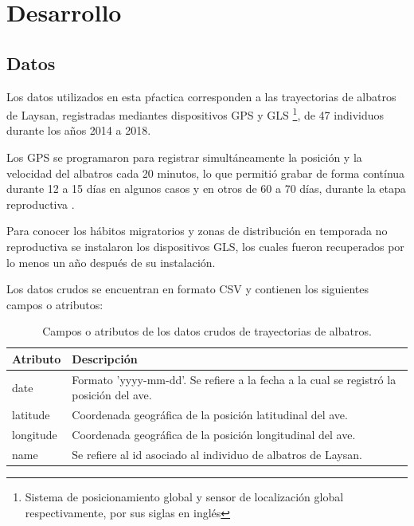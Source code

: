 
\section{Desarrollo}



\subsection{Datos}

Los datos utilizados en esta pŕactica corresponden a las trayectorias de
albatros de Laysan, registradas mediantes dispositivos GPS y GLS
\footnote{Sistema de posicionamiento global y sensor de localización global
respectivamente, por sus siglas en inglés}, de 47 individuos durante los años
2014 a 2018.

Los GPS se programaron para registrar simultáneamente la posición y la velocidad
del albatros cada 20 minutos, lo que permitió grabar de forma contínua durante
12 a 15 días en algunos casos y en otros de 60 a 70 días, durante la etapa
reproductiva \cite{hernandez2019ecologia}.

Para conocer los hábitos migratorios y zonas de distribución en temporada no
reproductiva se instalaron los dispositivos GLS, los cuales fueron recuperados
por lo menos un año después de su instalación.

Los datos crudos se encuentran en formato CSV y contienen los siguientes campos
o atributos:

\begin{table}[h!]
\caption{Campos o atributos de los datos crudos de trayectorias de albatros.}
\begin{center}
    \begin{tabular}{ l  m{7cm} }
        \hline
        Atributo & Descripción \\
        \hline
        date & Formato 'yyyy-mm-dd'. Se refiere a la fecha a la cual se registró
        la posición del ave. \\
        \hline
        latitude & Coordenada geográfica de la posición latitudinal del ave. \\
        \hline
        longitude & Coordenada geográfica de la posición longitudinal del ave.
        \\
        \hline
        name & Se refiere al id asociado al individuo de albatros de Laysan.\\
        \hline
    \end{tabular}
\end{center}
\end{table}


